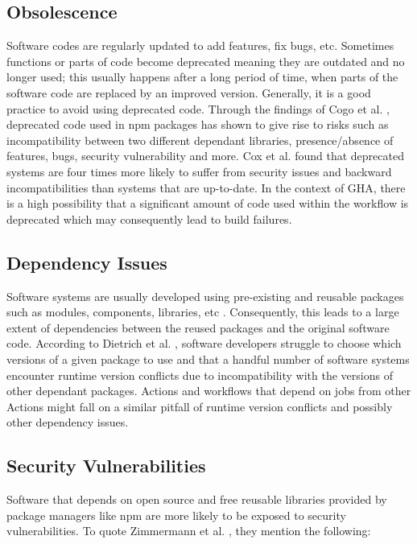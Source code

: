 \documentclass[conference]{IEEEtran}
\begin{document}
    \subsection{Obsolescence}
        Software codes are regularly updated to add features, fix bugs, etc. Sometimes functions or parts of code become deprecated meaning they are outdated and no longer used; this usually happens after a long period of time, when parts of the software code are replaced by an improved version. Generally, it is a good practice to avoid using deprecated code. Through the findings of Cogo et al. \cite{cogo2021deprecation}, deprecated code used in npm packages has shown to give rise to risks such as incompatibility between two different dependant libraries, presence/absence of features, bugs, security vulnerability and more. Cox et al. \cite{cox2015measuring} found that deprecated systems are four times more likely to suffer from security issues and backward incompatibilities than systems that are up-to-date. In the context of GHA, there is a high possibility that a significant amount of code used within the workflow is deprecated which may consequently lead to build failures.

    \subsection{Dependency Issues}
        Software systems are usually developed using pre-existing and reusable packages such as modules, components, libraries, etc \cite{decan2019empirical}\cite{soto2021comprehensive}. Consequently, this leads to a large extent of dependencies between the reused packages and the original software code. According to Dietrich et al. \cite{dietrich2019dependency}, software developers struggle to choose which versions of a given package to use and that a handful number of software systems encounter runtime version conflicts due to incompatibility with the versions of other dependant packages. Actions and workflows that depend on jobs from other Actions might fall on a similar pitfall of runtime version conflicts and possibly other dependency issues.

    \subsection{Security Vulnerabilities}
        Software that depends on open source and free reusable libraries provided by package managers like npm are more likely to be exposed to security vulnerabilities. To quote Zimmermann et al. \cite{zimmermann2019small}, they mention the following: \\
\end{document}
